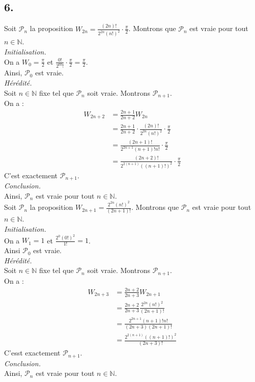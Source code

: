 \documentclass[10pt]{article}
\begin{document}
\subsection*{6.}
\begin{tcolorbox}[enhanced, width=7in, center, size=fbox, fontupper=\large, drop shadow southwest]
    Soit $\mathcal{P}_n$ la proposition $W_{2n}=\frac{(2n)!}{2^{2n}(n!)^2}\cdot\frac{\pi}{2}$. Montrons que $\mathcal{P}_n$ est vraie pour tout $n\in\mathbb{N}$.\\
    \emph{Initialisation.}\\
    On a $W_0=\frac{\pi}{2}$ et $\frac{0!}{2^00!}\cdot\frac{\pi}{2}=\frac{\pi}{2}$.\\
    Ainsi, $\mathcal{P}_0$ est vraie.\\
    \emph{Hérédité.}\\
    Soit $n\in\mathbb{N}$ fixe tel que $\mathcal{P}_n$ soit vraie. Montrons $\mathcal{P}_{n+1}$.\\
    On a :
    \begin{align*}
        W_{2n+2}&=\frac{2n+1}{2n+2}W_{2n}\\
        &=\frac{2n+1}{2n+2}\cdot\frac{(2n)!}{2^{2n}(n!)^2}\cdot\frac{\pi}{2}\\
        &=\frac{(2n+1)!}{2^{2n+1}(n+1)!n!}\cdot\frac{\pi}{2}\\
        &=\frac{(2n+2)!}{2^{2(n+1)}((n+1)!)^2}\cdot\frac{\pi}{2}
    \end{align*}
    C'est exactement $\mathcal{P}_{n+1}$.\\
    \emph{Conclusion.}\\
    Ainsi, $\mathcal{P}_n$ est vraie pour tout $n \in \mathbb{N}$.\\[0.25cm]
    Soit $\mathcal{P}_n$ la proposition $W_{2n+1}=\frac{2^{2n}(n!)^2}{(2n+1)!}$. Montrons que $\mathcal{P}_n$ est vraie pour tout $n\in\mathbb{N}$.\\
    \emph{Initialisation.}\\
    On a $W_1=1$ et $\frac{2^0(0!)^2}{1!}=1$.\\
    Ainsi $\mathcal{P}_0$ est vraie.\\
    \emph{Hérédité.}\\
    Soit $n\in\mathbb{N}$ fixe tel que $\mathcal{P}_n$ soit vraie. Montrons $\mathcal{P}_{n+1}$.\\
    On a :
    \begin{align*}
        W_{2n+3}&=\frac{2n+2}{2n+3}W_{2n+1}\\
        &=\frac{2n+2}{2n+3}\frac{2^{2n}(n!)^2}{(2n+1)!}\\
        &=\frac{2^{2n+1}(n+1)!n!}{(2n+3)(2n+1)!}\\
        &=\frac{2^{2(n+1)}((n+1)!)^2}{(2n+3)!}
    \end{align*}
    C'esst exactement $\mathcal{P}_{n+1}$.\\
    \emph{Conclusion.}\\
    Ainsi, $\mathcal{P}_n$ est vraie pour tout $n\in\mathbb{N}$.
\end{tcolorbox}
\end{document}
